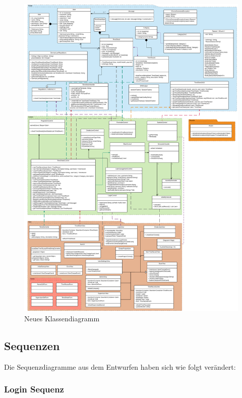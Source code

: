 \begin{figure}[H]
	\centering
	\includegraphics[scale=0.135]{Class-Diagramm-new.pdf}
	\caption{Neues Klassendiagramm}
\end{figure}
\newpage

\subsection{Sequenzen}
Die Sequenzdiagramme aus dem Entwurfen haben sich wie folgt verändert:
\subsubsection{Login Sequenz}

